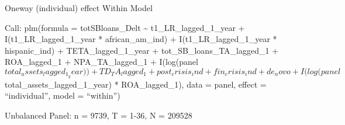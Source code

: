 \documentclass[]{article}
\newenvironment{Shaded}{\begin{snugshade}}{\end{snugshade}}
\newcommand{\DataTypeTok}[1]{\textcolor[rgb]{0.13,0.29,0.53}{#1}}
\newcommand{\DecValTok}[1]{\textcolor[rgb]{0.00,0.00,0.81}{#1}}
\newcommand{\KeywordTok}[1]{\textcolor[rgb]{0.13,0.29,0.53}{\textbf{#1}}}
\newcommand{\NormalTok}[1]{#1}
\newcommand{\OperatorTok}[1]{\textcolor[rgb]{0.81,0.36,0.00}{\textbf{#1}}}
\newcommand{\StringTok}[1]{\textcolor[rgb]{0.31,0.60,0.02}{#1}}
\begin{document}
\begin{Shaded}
\end{Shaded}

Oneway (individual) effect Within Model

Call: plm(formula = totSBloans\_Delt \textasciitilde{}
t1\_LR\_lagged\_1\_year + I(t1\_LR\_lagged\_1\_year * african\_am\_ind)
+ I(t1\_LR\_lagged\_1\_year * hispanic\_ind) + TETA\_lagged\_1\_year +
tot\_SB\_loans\_TA\_lagged\_1 + ROA\_lagged\_1 + NPA\_TA\_lagged\_1 +
I(log(panel\(total_assets_lagged_1_year)) +  TD_TA_lagged_1 + post_crisis_ind + fin_crisis_ind + de_novo +  I(log(panel\)total\_assets\_lagged\_1\_year)
* ROA\_lagged\_1), data = panel, effect = ``individual'', model =
``within'')

Unbalanced Panel: n = 9739, T = 1-36, N = 209528
\end{document}
